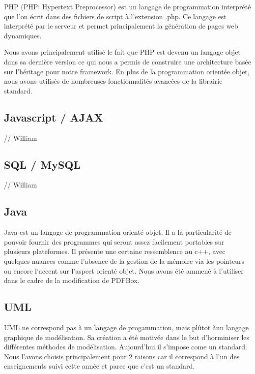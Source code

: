 PHP \cite{php} (PHP: Hypertext Preprocessor) est un langage de programmation interprété que l'on écrit
dans des fichiers de script à l'extension .php. Ce langage est interprété par le serveur
et permet principalement la génération de pages web dynamiques.

Nous avons principalement utilisé le fait que PHP est devenu un langage objet dans sa dernière version
ce qui nous a permis de construire une architecture basée sur l'héritage pour notre framework.
En plus de la programmation orientée objet, nous avons utilisés de nombreuses fonctionnalités avancées
de la librairie standard.

        \subsection{Javascript / AJAX}

// William

        \subsection{SQL / MySQL}

// William

        \subsection{Java}
Java est un langage de programmation orienté objet. Il a la particularité de pouvoir fournir des 
programmes qui seront assez facilement portables sur plusieurs plateformes. Il présente une certaine
ressemblence au c++, avec quelques nuances comme l'absence de la gestion de la mémoire via les pointeurs
ou encore l'accent sur l'aspect orienté objet.
Nous avons été ammené à l'utiliser dans le cadre de la modification de PDFBox. 

       \subsection{UML}
UML ne correspond pas à un langage de progammation, mais plûtot àun langage graphique de modélisation.
Sa création a été motivée dans le but d'horminiser les différentes méthodes de modélisation. Aujourd'hui il s'impose come 
un standard. Nous l'avons choisis principalement pour 2 raisons car il correspond à l'un des enseignements suivi cette année
et parce que c'est un standard.

